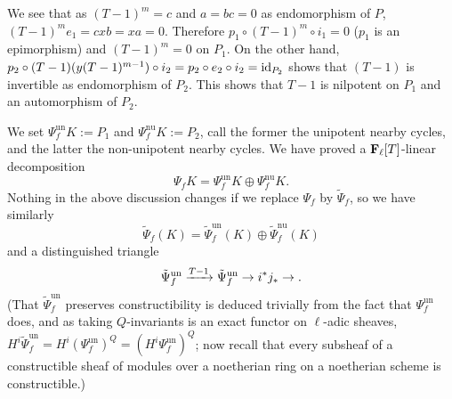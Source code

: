 \documentclass[deligne.tex]{subfiles}
\begin{document}
We see that as $(T-1)^m=c$ and $a=bc=0$ as
endomorphism of $P$, $(T-1)^me_1=cxb=xa=0$.
Therefore $p_1\circ (T-1)^m\circ i_1=0$ ($p_1$ is an epimorphism) and
$(T-1)^m=0$ on $P_1$.
On the other hand,
$p_2\circ (T-1)(y(T-1)^{m-1})\circ i_2=p_2\circ e_2\circ i_2=\operatorname{id}_{P_2}$
shows that $(T-1)$ is invertible as endomorphism of $P_2$.
This shows that $T-1$ is nilpotent on $P_1$ and an automorphism of $P_2$.

We set $\Psi_f^{\mathrm{un}}K:=P_1$ and $\Psi_f^{\mathrm{nu}}K:=P_2$,
call the former the unipotent nearby cycles, and the latter the
non-unipotent nearby cycles. We have proved a $\mathbf{F}_\ell[T]$-linear 
decomposition 
\begin{equation*}
	\Psi_fK=\Psi_f^{\mathrm{un}}K\oplus\Psi_f^{\mathrm{nu}}K.
\end{equation*}
Nothing in the above discussion changes if we replace
$\Psi_f$ by $\tilde \Psi_f$, so we have similarly
\begin{equation*}
	\tilde\Psi_f(K)=\tilde\Psi_f^{\text{un}}(K)\oplus\tilde\Psi_f^{\text{nu}}(K)
\end{equation*}
and a distinguished triangle
\begin{equation*}
	\tilde\Psi_f^{\text{un}}\xrightarrow{T-1}\tilde\Psi_f^{\text{un}}\rightarrow i^*j_*\rightarrow.
\end{equation*}
(That $\tilde\Psi_f^{\mathrm{un}}$ preserves constructibility is deduced
trivially from the fact that $\Psi_f^{\mathrm{un}}$ does, and as
taking $Q$-invariants is an exact functor on $\ell$-adic sheaves,
$H^i\tilde\Psi_f^{\mathrm{un}}=H^i(\Psi_f^{\mathrm{un}})^Q= (H^i\Psi_f^{\mathrm{un}})^Q$; now recall that every subsheaf of a
constructible sheaf of modules over a noetherian ring on a noetherian scheme
is constructible.)
\end{document}
